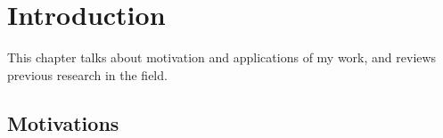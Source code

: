 \chapter{Introduction}
\label{cha:introduction}

This chapter talks about motivation and applications of my work, and reviews previous research in the field.

\section{Motivations}
\label{sec:motivations}



